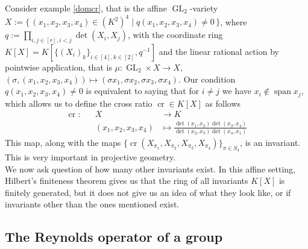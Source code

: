 \begin{dexample}\label{crinv}
  Consider example \ref{domcr}, that is the affine $\operatorname{GL}_2$-variety $X := \{\, (x_1,x_2,x_3,x_4) \in (K^2)^4 \mid q(x_1,x_2,x_3,x_4) \neq 0 \,\}$, where $q := \prod_{i,j \in [r], i<j} \operatorname{det}(X_i,X_j)$, with the coordinate ring $K[X] = K[\{(X_i)_k\}_{i \in [4], k \in [2]},q^{-1}]$ and the linear rational action by pointwise application, that is $\mu \colon \operatorname{GL}_2 \times X \rightarrow X$, $(\sigma,(x_1,x_2,x_3,x_4)) \mapsto (\sigma x_1,\sigma x_2,\sigma x_3,\sigma x_4)$.
  Our condition $q(x_1,x_2,x_3,x_4) \neq 0$ is equivalent to saying that for $i\neq j$ we have $x_i \notin \operatorname{span}{x_j}$, which allows us to define the cross ratio $\operatorname{cr} \in K[X]$ as follows
  \begin{equation}
    \begin{aligned}
      \operatorname{cr} \colon&&X&\rightarrow K \\
      &&(x_1,x_2,x_3,x_4) &\longmapsto \frac{\operatorname{det}(x_1,x_2)\operatorname{det}(x_3,x_4)}{\operatorname{det}(x_2,x_3)\operatorname{det}(x_4,x_1)}
    \end{aligned}
  \end{equation}
  This map, along with the maps $\{\operatorname{cr}(X_{\pi_1},X_{\pi_2},X_{\pi_3},X_{\pi_4})\}_{\pi \in S_4}$, is an invariant.
  This is very important in projective geometry.\\
  We now ask question of how many other invariants exist.
  In this affine setting, Hilbert's finiteness theorem gives us that the ring of all invariants $K[X]$ is finitely generated, but it does not give us an idea of what they look like, or if invariants other than the ones mentioned exist.
\end{dexample}

\subsection{The Reynolds operator of a group}



